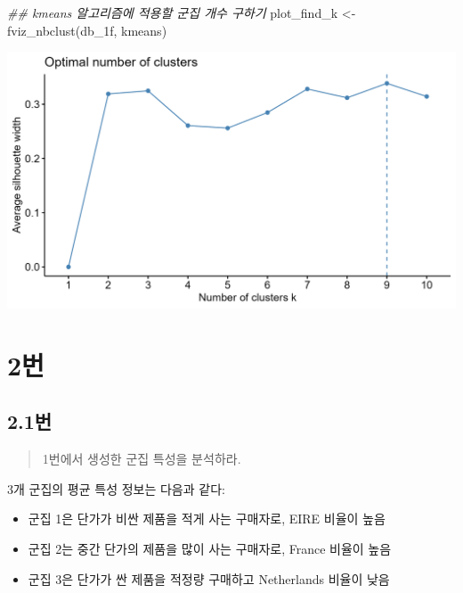 \documentclass[
  letterpaper,
  DIV=11,
  numbers=noendperiod]{scrreprt}
\newenvironment{Shaded}{\begin{snugshade}}{\end{snugshade}}
\newcommand{\DocumentationTok}[1]{\textcolor[rgb]{0.37,0.37,0.37}{\textit{#1}}}
\newcommand{\FunctionTok}[1]{\textcolor[rgb]{0.28,0.35,0.67}{#1}}
\newcommand{\NormalTok}[1]{\textcolor[rgb]{0.00,0.23,0.31}{#1}}
\newcommand{\OtherTok}[1]{\textcolor[rgb]{0.00,0.23,0.31}{#1}}
\providecommand{\tightlist}{%
  \setlength{\itemsep}{0pt}\setlength{\parskip}{0pt}}\usepackage{longtable,booktabs,array}
\begin{document}
\begin{Shaded}
\begin{Highlighting}[]
\DocumentationTok{\#\# kmeans 알고리즘에 적용할 군집 개수 구하기}
\NormalTok{plot\_find\_k }\OtherTok{\textless{}{-}} \FunctionTok{fviz\_nbclust}\NormalTok{(db\_1f, kmeans)}
\end{Highlighting}
\end{Shaded}

\includegraphics{./test/26/plot_1-3.png}

\hypertarget{uxbc88-21}{%
\chapter*{2번}\label{uxbc88-21}}


\hypertarget{uxbc88-22}{%
\section*{2.1번}\label{uxbc88-22}}


\begin{quote}
1번에서 생성한 군집 특성을 분석하라.
\end{quote}

3개 군집의 평균 특성 정보는 다음과 같다:

\begin{itemize}
\tightlist
\item
  군집 1은 단가가 비싼 제품을 적게 사는 구매자로, EIRE 비율이 높음
\item
  군집 2는 중간 단가의 제품을 많이 사는 구매자로, France 비율이 높음
\item
  군집 3은 단가가 싼 제품을 적정량 구매하고 Netherlands 비율이 낮음
\end{itemize}
\end{document}
